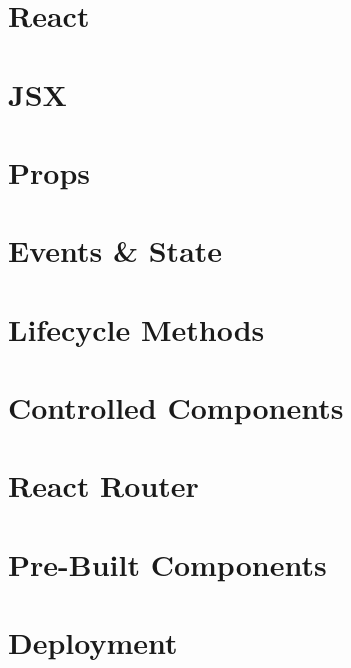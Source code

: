 \documentclass[b5paper,openany]{book}
\begin{document}
\tp


\tableofcontents



\chapter{React}


\chapter{JSX}


\chapter{Props}


\chapter{Events \& State}


\chapter{Lifecycle Methods}


\chapter{Controlled Components}


\chapter{React Router}


\chapter{Pre-Built Components}


\chapter{Deployment}

\end{document}
